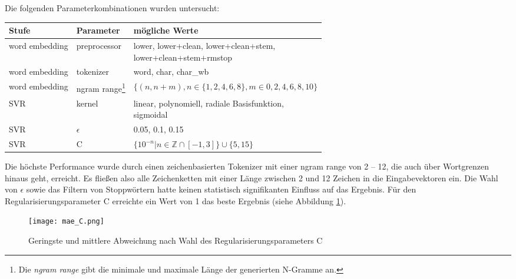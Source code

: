 Die folgenden Parameterkombinationen wurden untersucht:

\begin{table}[htb]
    \begin{tabular}{|l|l|l|}
    \hline
    Stufe          & Parameter    & mögliche Werte                                                \\ \hline
    word embedding & preprocessor & \makecell{lower, lower+clean, lower+clean+stem, \\ lower+clean+stem+rmstop} \\ \hline
    word embedding & tokenizer     & word, char, char\_wb                                          \\ \hline
    word embedding & ngram range\footnote{Die \textit{ngram range} gibt die minimale und maximale Länge der generierten N-Gramme an.}  & $\{(n, n+m), n \in \{1, 2, 4, 6, 8\}, m \in {0, 2, 4, 6, 8, 10}\}$                            \\ \hline
    SVR            & kernel       & \makecell{linear, polynomiell, radiale Basisfunktion,\\sigmoidal} \\ \hline
    SVR            & $\epsilon$      & 0.05, 0.1, 0.15                                               \\ \hline
    SVR            & C            & $\{10^{-n} | n \in \mathbb{Z} \cap [-1, 3] \} \cup \{5, 15\}$            \\ \hline
    \end{tabular}%
\end{table}

Die höchste Performance wurde durch einen zeichenbasierten Tokenizer mit einer ngram range von 2 -- 12, die auch über Wortgrenzen hinaus geht, erreicht. Es fließen also alle Zeichenketten mit einer Länge zwischen 2 und 12 Zeichen in die Eingabevektoren ein. Die Wahl von $\epsilon$ sowie das Filtern von Stoppwörtern hatte keinen statistisch signifikanten Einfluss auf das Ergebnis. Für den Regularisierungsparameter C erreichte ein Wert von 1 das beste Ergebnis (siehe Abbildung \ref{fig:mae_c}).

\begin{figure}[htb]
    \captionsetup{justification=centering}
    \centering
    \texttt{[image: mae\_C.png]}
    \caption{Geringste und mittlere Abweichung nach Wahl des Regularisierungsparameters C}
    \label{fig:mae_c}
\end{figure}

